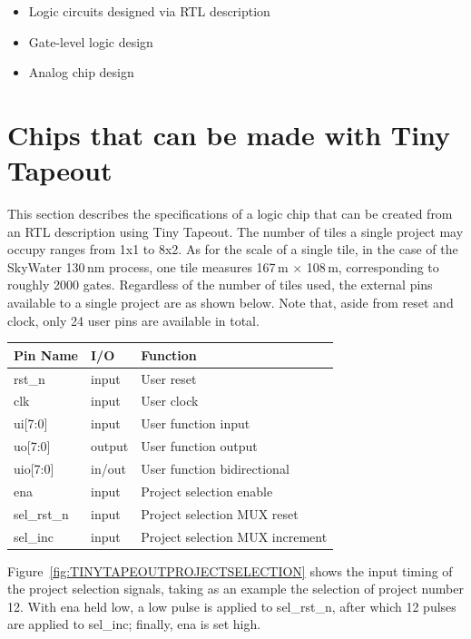 \begin{itemize}
  \item Logic circuits designed via RTL description
  \item Gate-level logic design
  \item Analog chip design
\end{itemize}

\section{Chips that can be made with Tiny Tapeout}
This section describes the specifications of a logic chip that can be created from an RTL description using Tiny Tapeout. The number of tiles a single project may occupy ranges from 1x1 to 8x2. As for the scale of a single tile, in the case of the SkyWater 130\,nm process, one tile measures 167\,\textmu m $\times$ 108\,\textmu m, corresponding to roughly 2000 gates. Regardless of the number of tiles used, the external pins available to a single project are as shown below. Note that, aside from reset and clock, only 24 user pins are available in total.

\begin{table}[h]
\centering
\begin{tabular}{|l|l|l|}
\hline
\textbf{Pin Name} & \textbf{I/O} & \textbf{Function} \\
\hline
rst\_n     & input  & User reset \\
clk        & input  & User clock \\
ui[7:0]    & input  & User function input \\
uo[7:0]    & output & User function output \\
uio[7:0]   & in/out & User function bidirectional \\
\hline
ena        & input  & Project selection enable \\
sel\_rst\_n & input  & Project selection MUX reset \\
sel\_inc   & input  & Project selection MUX increment \\
\hline
\end{tabular}
\end{table}

Figure~\ref{fig:TINYTAPEOUTPROJECTSELECTION} shows the input timing of the project selection signals, taking as an example the selection of project number 12. With ena held low, a low pulse is applied to sel\_rst\_n, after which 12 pulses are applied to sel\_inc; finally, ena is set high.

